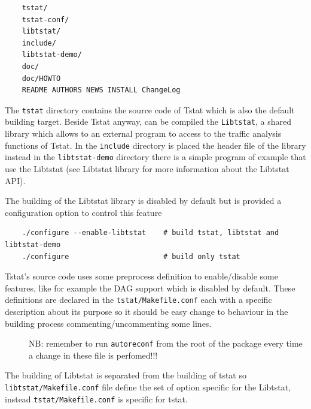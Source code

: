 \documentclass[11pt]{article}
\begin{document}
\begin{small}\begin{verbatim}
    tstat/
    tstat-conf/
    libtstat/
    include/
    libtstat-demo/
    doc/ 
    doc/HOWTO
    README AUTHORS NEWS INSTALL ChangeLog
\end{verbatim}\end{small} \noindent
The \texttt{tstat} directory contains the source code of Tstat which
is also the default building target. Beside Tstat anyway, can be compiled
the \texttt{Libtstat}, a shared library which allows to an external program to access 
to the traffic analysis functions of Tstat. In the \texttt{include} directory is placed the
header file of the library instead in the \texttt{libtstat-demo} directory there is a simple 
program of example that use the Libtstat 
(see \textsf{Libtstat library} for more information about the Libtstat API).



The building of the Libtstat library is disabled by default but is provided
a configuration option to control this feature

\begin{small}\begin{verbatim}
    ./configure --enable-libtstat    # build tstat, libtstat and libtstat-demo
    ./configure                      # build only tstat
\end{verbatim}\end{small} \noindent
Tstat's source code uses some preprocess definition to enable/disable some features,
like for example the DAG support which is disabled by default.
These definitions are declared in the \texttt{tstat/Makefile.conf} each with a specific 
description about its purpose so it should be easy change to behaviour in the building
process commenting/uncommenting some lines.

\begin{description}

\item[{}] \mbox{}

NB: remember to run \texttt{autoreconf} from the root of the package every time 
a change in these file is perfomed!!!

\end{description}


The building of Libtstat is separated from the building of tstat so \texttt{libtstat/Makefile.conf}
file define the set of option specific for the Libtstat, instead \texttt{tstat/Makefile.conf}
is specific for tstat.
\end{document}
